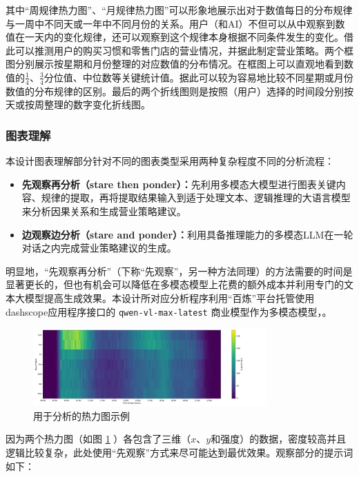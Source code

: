 其中“周规律热力图”、“月规律热力图”可以形象地展示出对于数值每日的分布规律与一周中不同天或一年中不同月份的关系。用户（和AI）不但可以从中观察到数值在一天内的变化规律，还可以观察到这个规律本身根据不同条件发生的变化。借此可以推测用户的购买习惯和零售门店的营业情况，并据此制定营业策略。两个框图分别展示按星期和月份整理的对应数值的分布情况。在框图上可以直观地看到数值的$\frac{1}{4}$、$\frac{3}{4}$分位值、中位数等关键统计值。据此可以较为容易地比较不同星期或月份数值的分布规律的区别。最后的两个折线图则是按照（用户）选择的时间段分别按天或按周整理的数字变化折线图。

\subsubsection{图表理解}

本设计图表理解部分针对不同的图表类型采用两种复杂程度不同的分析流程：

\begin{itemize}
    \item \textbf{先观察再分析（stare then ponder）：}先利用多模态大模型进行图表关键内容、规律的提取，再将提取结果输入到适于处理文本、逻辑推理的大语言模型来分析因果关系和生成营业策略建议。
    \item \textbf{边观察边分析（stare and ponder）：}利用具备推理能力的多模态LLM在一轮对话之内完成营业策略建议的生成。
\end{itemize}

明显地，“先观察再分析”（下称“先观察”，另一种方法同理）的方法需要的时间是显著更长的，但也有机会可以降低在多模态模型上花费的额外成本并利用专门的文本大模型提高生成效果。本设计所对应分析程序利用“百炼”平台托管使用dashscope应用程序接口的 \verb|qwen-vl-max-latest| 商业模型作为多模态模型，。

\begin{figure}[htbp]
	\centering
	\includegraphics[width=0.8\textwidth, height=0.3\textheight, keepaspectratio]{./imgs/aly-grocery-xtod-ydow-vquantity.png}
	\caption{用于分析的热力图示例}
	\label{fig:heat-graph}
\end{figure}

因为两个热力图（如图 \ref{fig:heat-graph} ）各包含了三维（$x$、$y$和强度）的数据，密度较高并且逻辑比较复杂，此处使用“先观察”方式来尽可能达到最优效果。观察部分的提示词如下：

